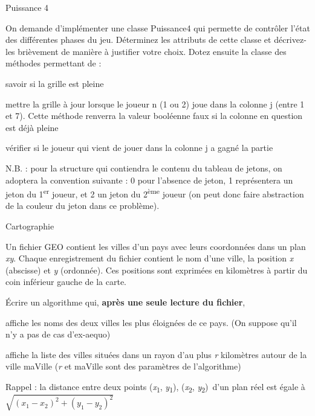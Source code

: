\begin{Exercice}{Puissance 4}
	
	On demande d’implémenter une classe Puissance4 qui permette de contrôler
	l’état des différentes phases du jeu. Déterminez les attributs de cette
	classe et décrivez-les brièvement de manière à justifier votre choix.
	Dotez ensuite la classe des méthodes permettant de :

	\begin{liste}
		\item 
			savoir si la grille est pleine
		\item 
			mettre la grille à jour lorsque le joueur n (1 ou 2) joue dans la
			colonne j (entre 1 et 7). Cette méthode renverra la valeur booléenne
			faux si la colonne en question est déjà pleine
		\item 
			vérifier si le joueur qui vient de jouer dans la colonne j a gagné la
			partie
	\end{liste}
	
	N.B. : pour la structure qui contiendra le contenu du tableau de jetons,
	on adoptera la convention suivante : 0 pour l’absence de jeton, 1
	représentera un jeton du 1\textsuperscript{er} joueur, et 2 un jeton du
	2\textsuperscript{ème} joueur (on peut donc faire abstraction de la
	couleur du jeton dans ce problème).
\end{Exercice}

\begin{Exercice}{Cartographie}

	Un fichier GEO contient les villes d’un pays avec
	leurs coordonnées dans un plan
	\textit{xy}. Chaque
	enregistrement du fichier contient le nom d’une ville, la position
	\textit{x} (abscisse) et
	\textit{y} (ordonnée). Ces
	positions sont exprimées en kilomètres à partir du coin inférieur
	gauche de la carte.

	Écrire un algorithme qui,
	\textbf{après une seule lecture du
	fichier}, 

	\begin{liste}
		\item
			affiche les noms des deux villes les plus éloignées de ce pays. (On
			suppose qu’il n’y a pas de cas d’ex-aequo)
		\item 
			affiche la liste des villes situées dans un rayon d’au
			plus \textit{r} kilomètres autour
			de la ville maVille
			(\textit{r} et maVille sont des
			paramètres de l’algorithme)
	\end{liste}
	
	Rappel : la distance entre deux
	points
	(\textit{x}\textsubscript{1},
	\textit{y}\textsubscript{1}),
	(\textit{x}\textsubscript{2},
	\textit{y}\textsubscript{2})~d’un
	plan réel est égale à
	\\
	\begin{math}
		\sqrt{{(x_1 - x_2)}^2 + {(y_1 - y_2)}^2}
	\end{math}
\end{Exercice}

